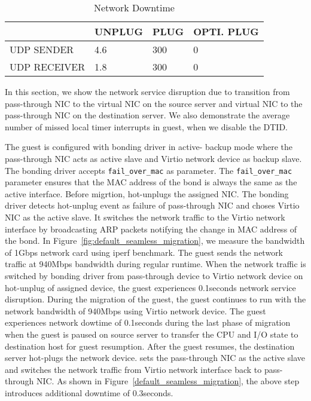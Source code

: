 

\begin{table}[tbp]
\begin{tabular}{|l|l|l|l|}
\hline
& UNPLUG & PLUG & OPTI. PLUG \\ \hline
UDP SENDER & 4.6 & 300 & 0 \\ \hline
UDP RECEIVER & 1.8 & 300 & 0 \\ \hline
\end{tabular}
\caption{Network Downtime}
\label{tab:migration_network_downtime}
\end{table}

In this section, we show the network service disruption
due to transition from pass-through NIC to the virtual NIC 
on the source server and virtual NIC to the pass-through
NIC on the destination server.
We also demonstrate the average 
number of missed local timer interrupts in guest, 
when we disable the DTID.

The guest is configured with bonding driver in active-
backup mode where the pass-through NIC acts as 
active slave and Virtio network device as 
backup slave. The bonding driver accepts 
\texttt{fail\_over\_mac} as parameter. The 
\texttt{fail\_over\_mac} parameter ensures that the
MAC address of the bond is always the same as the active
interface. Before migrtion, \na hot-unplugs the assigned
NIC. The bonding driver detects hot-unplug event as failure
of pass-through NIC and choses
Virtio NIC as the active slave. It switches the network 
traffic to the Virtio network interface by broadcasting
ARP packets notifying the change in MAC address of the bond.
In Figure~\ref{fig:default_seamless_migration}, we measure 
the bandwidth of 1Gbps network card using iperf benchmark. 
The guest sends the network traffic at 940Mbps bandwidth 
during regular runtime. When the network traffic is 
switched by bonding driver from pass-through device to 
Virtio network device on hot-unplug of assigned device, 
the guest experiences 0.1seconds network service disruption. 
During the migration of the guest, the guest continues
to run with the network bandwidth of 940Mbps using Virtio network
device. The guest experiences network dowtime of 
0.1seconds during the last phase of migration 
when the guest is paused on source server
to transfer the CPU and I/O state to destination host
for guest resumption. After the guest resumes, the
destination server hot-plugs the network device. \na
sets the pass-through NIC as the active slave and
switches the network traffic from Virtio network interface
back to pass-through NIC. As shown in 
Figure~\ref{default_seamless_migration}, the above step
introduces additional downtime of 0.3seconds.


